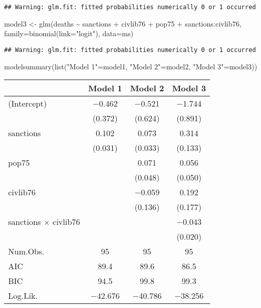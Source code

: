\documentclass[
]{article}
\newenvironment{Shaded}{\begin{snugshade}}{\end{snugshade}}
\newcommand{\AttributeTok}[1]{\textcolor[rgb]{0.77,0.63,0.00}{#1}}
\newcommand{\FunctionTok}[1]{\textcolor[rgb]{0.00,0.00,0.00}{#1}}
\newcommand{\NormalTok}[1]{#1}
\newcommand{\OtherTok}[1]{\textcolor[rgb]{0.56,0.35,0.01}{#1}}
\newcommand{\SpecialCharTok}[1]{\textcolor[rgb]{0.00,0.00,0.00}{#1}}
\newcommand{\StringTok}[1]{\textcolor[rgb]{0.31,0.60,0.02}{#1}}
\begin{document}
\begin{verbatim}
## Warning: glm.fit: fitted probabilities numerically 0 or 1 occurred
\end{verbatim}

\begin{Shaded}
\begin{Highlighting}[]
\NormalTok{model3 }\OtherTok{\textless{}{-}} \FunctionTok{glm}\NormalTok{(deaths }\SpecialCharTok{\textasciitilde{}}\NormalTok{ sanctions }\SpecialCharTok{+}\NormalTok{ civlib76 }\SpecialCharTok{+}\NormalTok{ pop75 }\SpecialCharTok{+}\NormalTok{ sanctions}\SpecialCharTok{:}\NormalTok{civlib76,}
              \AttributeTok{family=}\FunctionTok{binomial}\NormalTok{(}\AttributeTok{link=}\StringTok{"logit"}\NormalTok{), }\AttributeTok{data=}\NormalTok{ms)}
\end{Highlighting}
\end{Shaded}

\begin{verbatim}
## Warning: glm.fit: fitted probabilities numerically 0 or 1 occurred
\end{verbatim}

\begin{Shaded}
\begin{Highlighting}[]
\FunctionTok{modelsummary}\NormalTok{(}\FunctionTok{list}\NormalTok{(}\StringTok{"Model 1"}\OtherTok{=}\NormalTok{model1, }\StringTok{"Model 2"}\OtherTok{=}\NormalTok{model2, }\StringTok{"Model 3"}\OtherTok{=}\NormalTok{model3))}
\end{Highlighting}
\end{Shaded}

\begin{table}
\centering
\begin{tabular}[t]{lccc}
\toprule
  & Model 1 & Model 2 & Model 3\\
\midrule
(Intercept) & \num{-0.462} & \num{-0.521} & \num{-1.744}\\
 & (\num{0.372}) & (\num{0.624}) & (\num{0.891})\\
sanctions & \num{0.102} & \num{0.073} & \num{0.314}\\
 & (\num{0.031}) & (\num{0.033}) & (\num{0.133})\\
pop75 &  & \num{0.071} & \num{0.056}\\
 &  & (\num{0.048}) & (\num{0.050})\\
civlib76 &  & \num{-0.059} & \num{0.192}\\
 &  & (\num{0.136}) & (\num{0.177})\\
sanctions × civlib76 &  &  & \num{-0.043}\\
 &  &  & (\num{0.020})\\
\midrule
Num.Obs. & \num{95} & \num{95} & \num{95}\\
AIC & \num{89.4} & \num{89.6} & \num{86.5}\\
BIC & \num{94.5} & \num{99.8} & \num{99.3}\\
Log.Lik. & \num{-42.676} & \num{-40.786} & \num{-38.256}\\
\bottomrule
\end{tabular}
\end{table}
\end{document}
